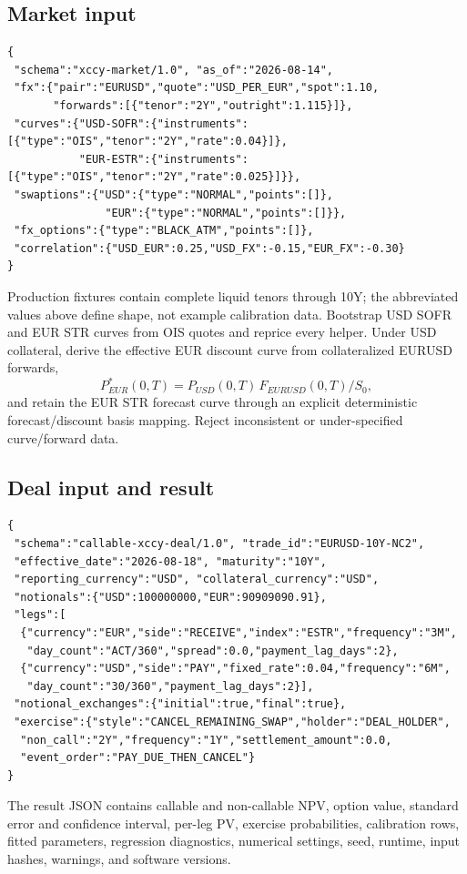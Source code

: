 \documentclass[9pt,letterpaper]{extarticle}
\begin{document}
\subsection{Market input}

\begin{lstlisting}
{
 "schema":"xccy-market/1.0", "as_of":"2026-08-14",
 "fx":{"pair":"EURUSD","quote":"USD_PER_EUR","spot":1.10,
       "forwards":[{"tenor":"2Y","outright":1.115}]},
 "curves":{"USD-SOFR":{"instruments":[{"type":"OIS","tenor":"2Y","rate":0.04}]},
           "EUR-ESTR":{"instruments":[{"type":"OIS","tenor":"2Y","rate":0.025}]}},
 "swaptions":{"USD":{"type":"NORMAL","points":[]},
               "EUR":{"type":"NORMAL","points":[]}},
 "fx_options":{"type":"BLACK_ATM","points":[]},
 "correlation":{"USD_EUR":0.25,"USD_FX":-0.15,"EUR_FX":-0.30}
}
\end{lstlisting}
Production fixtures contain complete liquid tenors through 10Y; the abbreviated values above define shape, not example calibration data. Bootstrap USD SOFR and EUR \texteuro STR curves from OIS quotes and reprice every helper. Under USD collateral, derive the effective EUR discount curve from collateralized EURUSD forwards,
\[
 P_{EUR}^{*}(0,T)=P_{USD}(0,T)\,F_{EURUSD}(0,T)/S_0,
\]
and retain the EUR \texteuro STR forecast curve through an explicit deterministic forecast/discount basis mapping. Reject inconsistent or under-specified curve/forward data.

\subsection{Deal input and result}

\begin{lstlisting}
{
 "schema":"callable-xccy-deal/1.0", "trade_id":"EURUSD-10Y-NC2",
 "effective_date":"2026-08-18", "maturity":"10Y",
 "reporting_currency":"USD", "collateral_currency":"USD",
 "notionals":{"USD":100000000,"EUR":90909090.91},
 "legs":[
  {"currency":"EUR","side":"RECEIVE","index":"ESTR","frequency":"3M",
   "day_count":"ACT/360","spread":0.0,"payment_lag_days":2},
  {"currency":"USD","side":"PAY","fixed_rate":0.04,"frequency":"6M",
   "day_count":"30/360","payment_lag_days":2}],
 "notional_exchanges":{"initial":true,"final":true},
 "exercise":{"style":"CANCEL_REMAINING_SWAP","holder":"DEAL_HOLDER",
  "non_call":"2Y","frequency":"1Y","settlement_amount":0.0,
  "event_order":"PAY_DUE_THEN_CANCEL"}
}
\end{lstlisting}
The result JSON contains callable and non-callable NPV, option value, standard error and confidence interval, per-leg PV, exercise probabilities, calibration rows, fitted parameters, regression diagnostics, numerical settings, seed, runtime, input hashes, warnings, and software versions.
\end{document}
